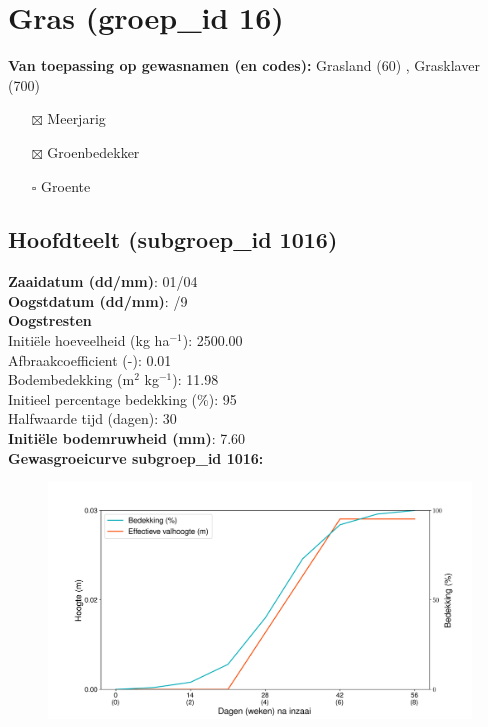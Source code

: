 \documentclass{article}
\begin{document}
 \section{Gras (groep\_id 16)} 
 \textbf{Van toepassing op gewasnamen (en codes):} Grasland (60) , Grasklaver (700) 
 \begin{multicols}{3} \begin{itemize} \item[$\boxtimes$] Meerjarig \item[$\boxtimes$] Groenbedekker \item[$\square$] Groente \end{itemize} \end{multicols} 
 \subsection{Hoofdteelt (subgroep\_id 1016)} 
  \textbf{Zaaidatum (dd/mm)}: 01/04  \vspace{0.10cm} \\ 
  \textbf{Oogstdatum (dd/mm)}: /9  \vspace{0.10cm} \\ 
  \textbf{Oogstresten} \vspace{0.05cm} \\ 
  \tab Initi\"{e}le hoeveelheid (kg ha$^{-1}$): 2500.00 \vspace{0.05cm} \\ 
  \tab Afbraakcoefficient (-): 0.01 \vspace{0.05cm} \\ 
  \tab Bodembedekking (m$^2$ kg$^{-1}$): 11.98 \vspace{0.05cm} \\ 
  \tab Initieel percentage bedekking (\%): 95 \vspace{0.05cm} \\ 
  \tab Halfwaarde tijd (dagen): 30 \vspace{0.05cm} \\ 
  \textbf{Initi\"{e}le bodemruwheid (mm)}: 7.60 \vspace{0.05cm} \\ 
  \textbf{Gewasgroeicurve subgroep\_id 1016:} 
 \begin{center} \begin{figure}[H] \includegraphics[width=12.5cm]{temp/1016.png} \end{figure} \end{center} 
\end{document}
